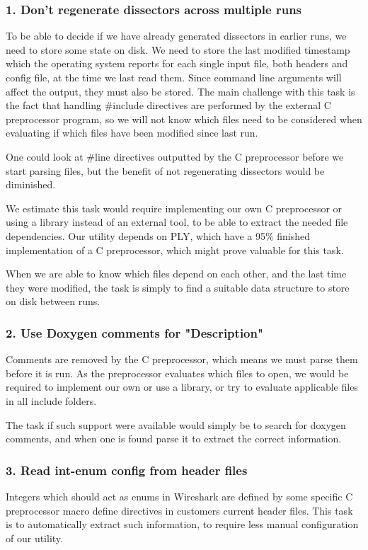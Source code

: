 \subsubsection{1. Don't regenerate dissectors across multiple runs}
To be able to decide if we have already generated dissectors in earlier runs, we need to store some state on disk. We need to store the last modified timestamp which the operating system reports for each single input file, both headers and config file, at the time we last read them. Since command line arguments will affect the output, they must also be stored. The main challenge with this task is the fact that handling \#include directives are performed by the external C preprocessor program, so we will not know which files need to be considered when evaluating if which files have been modified since last run.

One could look at \#line directives outputted by the C preprocessor before we start parsing files, but the benefit of not regenerating dissectors would be diminished.

We estimate this task would require implementing our own C preprocessor or using a library instead of an external tool, to be able to extract the needed file dependencies. Our utility depends on PLY, which have a 95\% finished implementation of a C preprocessor, which might prove valuable for this task.

When we are able to know which files depend on each other, and the last time they were modified, the task is simply to find a suitable data structure to store on disk between runs.

\subsubsection{2. Use Doxygen comments for "Description"}
Comments are removed by the C preprocessor, which means we must parse them before it is run. As the preprocessor evaluates which files to open, we would be required to implement our own or use a library, or try to evaluate applicable files in all include folders.

The task if such support were available would simply be to search for doxygen comments, and when one is found parse it to extract the correct information.

\subsubsection{3. Read int-enum config from header files}
Integers which should act as enums in Wireshark are defined by some specific C preprocessor macro define directives in customers current header files. This task is to automatically extract such information, to require less manual configuration of our utility.

